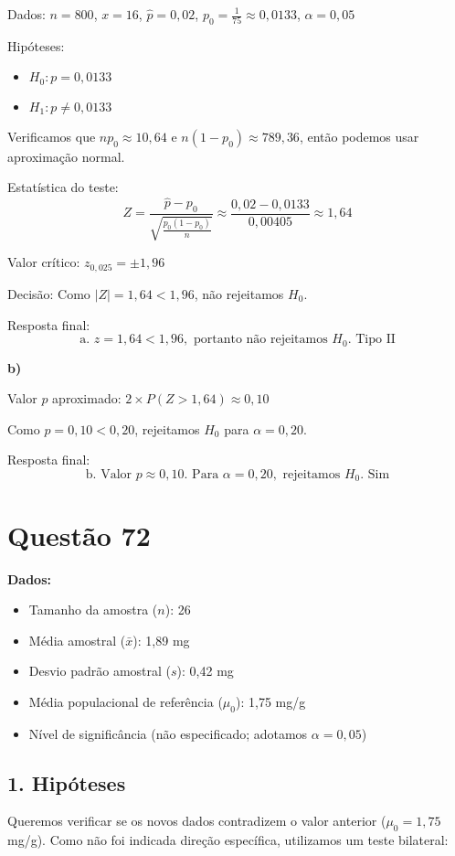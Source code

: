 \documentclass[12pt]{article}
\newcommand{\quest}[1]{\section*{Questão #1}} %
\begin{document}
Dados: $n = 800$, $x = 16$, $\hat{p} = 0{,}02$, $p_0 = \frac{1}{75} \approx 0{,}0133$, $\alpha = 0{,}05$

Hipóteses:
\begin{itemize}
  \item $H_0: p = 0{,}0133$
  \item $H_1: p \neq 0{,}0133$
\end{itemize}

Verificamos que $np_0 \approx 10{,}64$ e $n(1 - p_0) \approx 789{,}36$, então podemos usar aproximação normal.

Estatística do teste:
\[
Z = \frac{\hat{p} - p_0}{\sqrt{\frac{p_0(1 - p_0)}{n}}} \approx \frac{0{,}02 - 0{,}0133}{0{,}00405} \approx 1{,}64
\]

Valor crítico: $z_{0{,}025} = \pm 1{,}96$

Decisão: Como $|Z| = 1{,}64 < 1{,}96$, não rejeitamos $H_0$.

Resposta final:
\[
\boxed{\text{a. } z = 1{,}64 < 1{,}96, \text{ portanto não rejeitamos } H_0. \text{ Tipo II}}
\]

\textbf{b)}

Valor $p$ aproximado: $2 \times P(Z > 1{,}64) \approx 0{,}10$

Como $p = 0{,}10 < 0{,}20$, rejeitamos $H_0$ para $\alpha = 0{,}20$.

Resposta final:
\[
\boxed{\text{b. Valor } p \approx 0{,}10. \text{ Para } \alpha = 0{,}20, \text{ rejeitamos } H_0. \text{ Sim}}
\]

\quest{72}

\textbf{Dados:}
\begin{itemize}
    \item Tamanho da amostra (\(n\)): 26
    \item Média amostral (\(\bar{x}\)): 1,89 mg
    \item Desvio padrão amostral (\(s\)): 0,42 mg
    \item Média populacional de referência (\(\mu_0\)): 1,75 mg/g
    \item Nível de significância (não especificado; adotamos \(\alpha=0,05\))
\end{itemize}

\subsection*{1. Hipóteses}

Queremos verificar se os novos dados contradizem o valor anterior (\(\mu_0=1,75\) mg/g).  
Como não foi indicada direção específica, utilizamos um teste bilateral:
\end{document}
